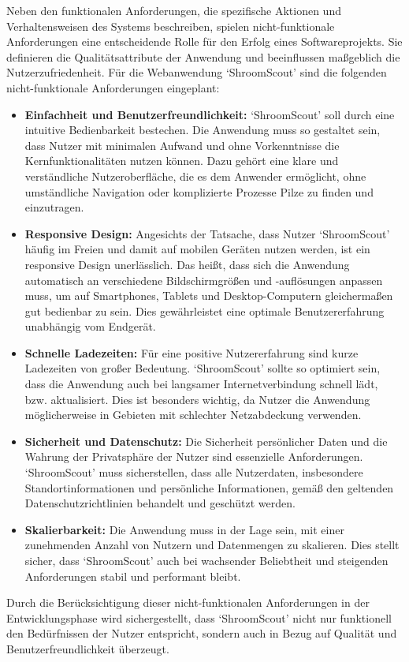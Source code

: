 \documentclass[../main.tex]{subfiles}
\begin{document}
Neben den funktionalen Anforderungen, die spezifische Aktionen und Verhaltensweisen des Systems beschreiben, spielen
nicht-funktionale Anforderungen eine entscheidende Rolle für den Erfolg eines Softwareprojekts. Sie definieren die
Qualitätsattribute der Anwendung und beeinflussen maßgeblich die Nutzerzufriedenheit. Für die Webanwendung `ShroomScout'
sind die folgenden nicht-funktionale Anforderungen eingeplant:

\begin{itemize}

	\item \textbf{Einfachheit und Benutzerfreundlichkeit:}
	      `ShroomScout' soll durch eine intuitive Bedienbarkeit bestechen. Die Anwendung muss so gestaltet sein, dass Nutzer mit
	      minimalen Aufwand und ohne Vorkenntnisse die Kernfunktionalitäten nutzen können. Dazu gehört eine klare und verständliche
	      Nutzeroberfläche, die es dem Anwender ermöglicht, ohne umständliche Navigation oder komplizierte Prozesse Pilze zu finden
	      und einzutragen.

	\item \textbf{Responsive Design:}
	      Angesichts der Tatsache, dass Nutzer `ShroomScout' häufig im Freien und damit auf mobilen Geräten nutzen werden, ist ein
	      responsive Design unerlässlich. Das heißt, dass sich die Anwendung automatisch an verschiedene Bildschirmgrößen und -auflösungen
	      anpassen muss, um auf Smartphones, Tablets und Desktop-Computern gleichermaßen gut bedienbar zu sein. Dies gewährleistet eine
	      optimale Benutzererfahrung unabhängig vom Endgerät.

	\item \textbf{Schnelle Ladezeiten:}
	      Für eine positive Nutzererfahrung sind kurze Ladezeiten von großer Bedeutung. `ShroomScout' sollte so optimiert sein, dass die
	      Anwendung auch bei langsamer Internetverbindung schnell lädt, bzw. aktualisiert. Dies ist besonders wichtig, da Nutzer die Anwendung
	      möglicherweise in Gebieten mit schlechter Netzabdeckung verwenden.

	\item \textbf{Sicherheit und Datenschutz:}
	      Die Sicherheit persönlicher Daten und die Wahrung der Privatsphäre der Nutzer sind essenzielle Anforderungen. `ShroomScout'
	      muss sicherstellen, dass alle Nutzerdaten, insbesondere Standortinformationen und persönliche Informationen, gemäß den
	      geltenden Datenschutzrichtlinien behandelt und geschützt werden.

	\item \textbf{Skalierbarkeit:}
	      Die Anwendung muss in der Lage sein, mit einer zunehmenden Anzahl von Nutzern und Datenmengen zu skalieren. Dies stellt
	      sicher, dass `ShroomScout' auch bei wachsender Beliebtheit und steigenden Anforderungen stabil und performant bleibt.

\end{itemize}

Durch die Berücksichtigung dieser nicht-funktionalen Anforderungen in der Entwicklungsphase wird sichergestellt, dass `ShroomScout'
nicht nur funktionell den Bedürfnissen der Nutzer entspricht, sondern auch in Bezug auf Qualität und Benutzerfreundlichkeit überzeugt.
\end{document}
